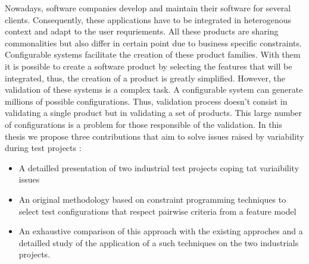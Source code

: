 Nowadays, software companies develop and maintain their software for several clients. Consequently, these applications have to  be integrated in heterogenous context and adapt to the user requriements. All these products are sharing commonalities but also differ in certain point due to business specific constraints.
Configurable systems facilitate the creation of these product families. With them it is possible to create a software product by selecting the features that will be integrated, thus, the creation of a product is greatly simplified. However,  the validation of these systems is a complex task. A configurable system can generate millions of possible configurations. Thus, validation process doesn't consist in validating a single product but in validating a set of products. This large number of configurations is a problem for those responsible of the validation.
In this thesis we propose three contributions that aim to solve issues raised by  variability during test projects : 

\begin{itemize}


\item  A detailled presentation of two industrial test projects coping tat variaibility issues 


\item An original methodology based on constraint programming techniques to select test configurations that respect pairwise criteria from a feature model


\item An exhaustive comparison of this approach with the existing approches and a detailled study of the application of a such techniques on the two industrials projects.
\end{itemize}
